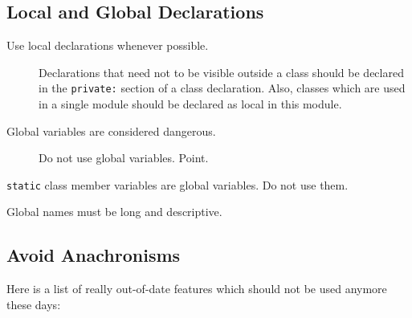 %
%

\subsection{Local and Global Declarations}

\begin{description}
  \item[Use local declarations whenever possible.]  Declarations that 
  need not to be visible outside a class should be declared in the 
  \texttt{private:} section of a class declaration.  Also, classes 
  which are used in a single module should be declared as local in 
  this module.

  \item[Global variables are considered dangerous.] Do not use global 
  variables. Point.
\end{description}

\begin{notes}
  \item \texttt{static} class member variables are global variables. 
  Do not use them.
  \item Global names must be long and descriptive.
\end{notes}


%
%

\subsection{Avoid Anachronisms}

Here is a list of really out-of-date features which should not be
used anymore these days:

